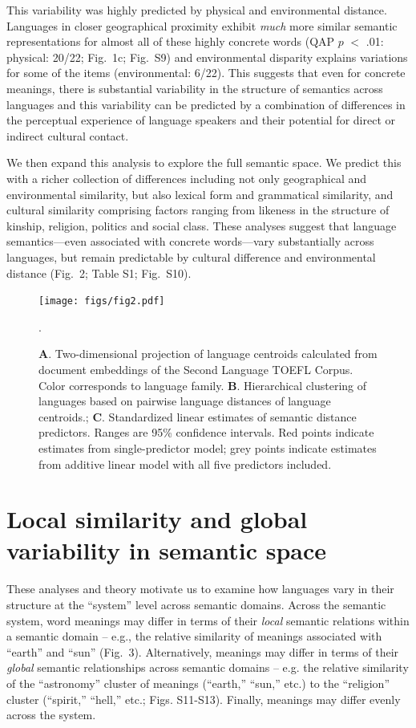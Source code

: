\documentclass[9pt,twocolumn,twoside,lineno]{pnas-new}
\begin{document}
This variability was highly predicted by physical and environmental distance. Languages in closer geographical proximity exhibit \textit{much} more similar semantic representations for almost all of these highly concrete words (QAP $p$ $<$ .01: physical: 20/22; Fig.\ 1c;  Fig.\ S9) and environmental disparity explains variations for some of the items (environmental: 6/22). This suggests that even for concrete meanings, there is substantial variability in the structure of semantics across languages and this variability can be predicted by a combination of differences in the perceptual experience of language speakers and their potential for direct or indirect cultural contact.  


We then expand this analysis to explore the full semantic space. We predict this with a richer collection of differences including not only geographical and environmental similarity, but also lexical form and grammatical similarity, and cultural similarity comprising factors ranging from likeness in the structure of kinship, religion, politics and social class. These analyses suggest that language semantics---even associated with concrete words---vary substantially across languages, but remain predictable by cultural difference and environmental distance (Fig.\ 2; Table S1; Fig.\ S10).

\begin{figure}[t!]
\centering
\texttt{[image: figs/fig2.pdf]}
\caption{{\textbf A.} Two-dimensional projection of language centroids calculated from  document embeddings of the Second Language TOEFL Corpus. Color corresponds to language family. {\textbf B.} Hierarchical clustering of languages based on pairwise language distances of language centroids.; {\textbf C.} Standardized linear estimates of semantic distance predictors. Ranges are 95\% confidence intervals. Red points indicate estimates from single-predictor model; grey points indicate estimates from additive linear model with all five predictors included.}.
\label{fig:fig2} 
\end{figure}



\section*{Local similarity and global variability in semantic space} %
These analyses and theory motivate us to examine how languages vary in their structure at the ``system'' level across semantic domains. Across the semantic system, word meanings may differ in terms of their {\it local} semantic relations within a semantic domain -- e.g., the relative similarity of meanings associated with ``earth'' and ``sun'' (Fig.\ 3). Alternatively, meanings may differ in terms of their {\it global} semantic relationships across semantic domains -- e.g. the relative similarity of the ``astronomy'' cluster of meanings (``earth,'' ``sun,'' etc.) to the ``religion'' cluster (``spirit,'' ``hell,'' etc.; Figs. S11-S13). Finally, meanings may differ evenly across the system. 
\end{document}
